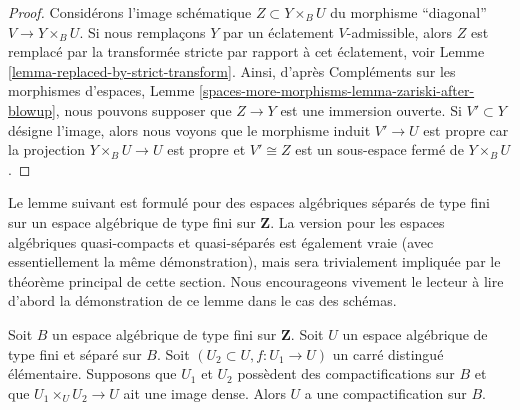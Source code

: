 \begin{proof}
Considérons l'image schématique $Z \subset Y \times_B U$
du morphisme ``diagonal'' $V \to Y \times_B U$. Si nous remplaçons
$Y$ par un éclatement $V$-admissible, alors $Z$ est remplacé par
la transformée stricte par rapport à cet éclatement, voir
Lemme \ref{lemma-replaced-by-strict-transform}. Ainsi, d'après
Compléments sur les morphismes d'espaces, Lemme
\ref{spaces-more-morphisms-lemma-zariski-after-blowup},
nous pouvons supposer que $Z \to Y$
est une immersion ouverte. Si $V' \subset Y$ désigne l'image, alors nous
voyons que le morphisme induit $V' \to U$ est propre car la
projection $Y \times_B U \to U$ est propre et $V' \cong Z$
est un sous-espace fermé de $Y \times_B U$.
\end{proof}

\noindent
Le lemme suivant est formulé pour des espaces algébriques séparés de type fini sur un espace algébrique de type fini sur $\mathbf{Z}$. La version pour les espaces algébriques quasi-compacts et quasi-séparés est également vraie (avec essentiellement la même démonstration), mais sera trivialement impliquée par le théorème principal de cette section. Nous encourageons vivement le lecteur à lire d'abord la démonstration de ce lemme dans le cas des schémas.

\begin{lemma}
\label{lemma-two-compactifications}
Soit $B$ un espace algébrique de type fini sur $\mathbf{Z}$.
Soit $U$ un espace algébrique de type fini et séparé sur $B$.
Soit $(U_2 \subset U, f : U_1 \to U)$ un carré distingué élémentaire. Supposons que $U_1$ et $U_2$ possèdent des compactifications sur $B$ et que $U_1 \times_U U_2 \to U$ ait une image dense.
Alors $U$ a une compactification sur $B$.
\end{lemma}

